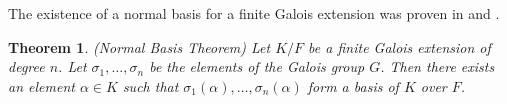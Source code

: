 \documentclass{article}
\theoremstyle{plain}
\newtheorem{theorem}{Theorem}
\theoremstyle{definition}
\newtheorem*{remark}{Remark}
\begin{document}
\noindent
The existence of a normal basis for a finite Galois extension was proven in \cite{NoetherNormalBasis} and \cite{Deuring}.
\begin{theorem}\cite[Theorem 6.13.1]{Lang}\label{NormalBasisTheorem} (Normal Basis Theorem)
Let $K/F$ be a finite Galois extension of degree $n$. Let $\sigma_1, \ldots , \sigma_n$ be the elements of the Galois group $G$. Then there exists an element $\alpha \in K$ such that $\sigma_1(\alpha), \ldots , \sigma_n(\alpha)$ form a basis of $K$ over $F$.
\end{theorem}
\end{document}
